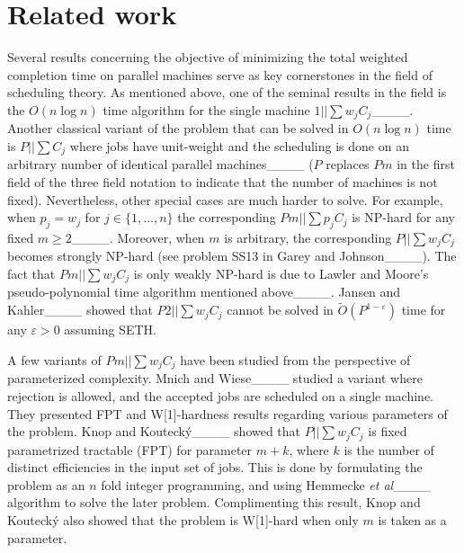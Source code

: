 \section{Related work}
Several results concerning the objective of minimizing the total weighted completion time on parallel machines serve as key cornerstones in the field of scheduling theory. As mentioned above, one of the seminal results in the field is the $O(n \log n)$ time algorithm for the single machine $1||\sum w_jC_j$____. Another classical variant of the problem that can be solved in $O(n \log n)$ time is $P|| \sum C_j$ where jobs have unit-weight and the scheduling is done on an arbitrary number of identical parallel machines____ ($P$ replaces $Pm$ in the first field of the three field notation to indicate that the number of machines is not fixed). Nevertheless, other special cases are much harder to solve. For example, when $p_j=w_j$ for $j\in\{1,\ldots,n\}$ the corresponding $Pm||\sum p_j C_j$ is NP-hard for any fixed $m \geq 2$____. Moreover, when $m$ is arbitrary, the corresponding $P||\sum w_j C_j$ becomes strongly NP-hard (see problem SS13 in Garey and Johnson____). The fact that $Pm||\sum w_j C_j$ is only weakly NP-hard is due to Lawler and Moore's pseudo-polynomial time algorithm mentioned above____. Jansen and Kahler____ showed that $P2||\sum w_j C_j$ cannot be solved in $\tilde{O}(P^{1-\varepsilon})$ time for any $\varepsilon > 0$ assuming SETH.%

A few variants of $Pm||\sum w_jC_j$ have been studied from the perspective of parameterized complexity. Mnich and Wiese____ studied a variant where rejection is allowed, and the accepted jobs are scheduled on a single machine. They presented FPT and W[1]-hardness results regarding various parameters of the problem.
Knop and Kouteck{\'{y}}____ showed that $P||\sum w_j C_j$ is fixed parametrized tractable (FPT) for parameter $m+k$, where $k$ is the number of distinct efficiencies in the input set of jobs. This is done by formulating the problem as an $n$ fold integer programming, and using Hemmecke \emph{et al}____ algorithm to solve the later problem. Complimenting this result, Knop and Kouteck{\'{y}} also showed that the problem is W[1]-hard when only $m$ is taken as a parameter.%


